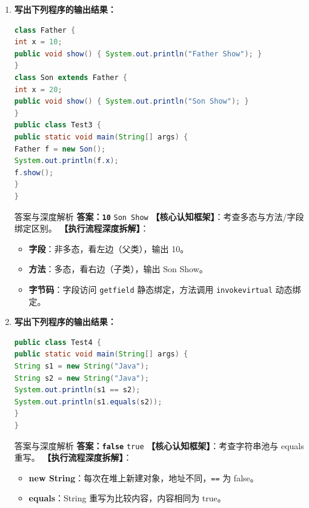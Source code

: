 ﻿\documentclass[12pt, a4paper]{ctexart}
\newcommand{\code}[1]{\texttt{#1}}
\begin{document}
\begin{enumerate}[label=\textbf{\arabic*.}, leftmargin=*, itemsep=1.5em]
	\item \textbf{写出下列程序的输出结果：}
	      \begin{lstlisting}[language=Java]
class Father {
int x = 10;
public void show() { System.out.println("Father Show"); }
}
class Son extends Father {
int x = 20;
public void show() { System.out.println("Son Show"); }
}
public class Test3 {
public static void main(String[] args) {
Father f = new Son();
System.out.println(f.x);
f.show();
}
}
\end{lstlisting}
	      \begin{bluebox}{答案与深度解析}
		      \textbf{答案：\code{10}} \newline \code{Son Show}
		      \textbf{【核心认知框架】}：考查多态与方法/字段绑定区别。
		      \textbf{【执行流程深度拆解】}：
		      \begin{itemize}[leftmargin=*, nosep]
			      \item \textbf{字段}：非多态，看左边（父类），输出 10。
			      \item \textbf{方法}：多态，看右边（子类），输出 Son Show。
			      \item \textbf{字节码}：字段访问 \code{getfield} 静态绑定，方法调用 \code{invokevirtual} 动态绑定。
		      \end{itemize}
	      \end{bluebox}

	\item \textbf{写出下列程序的输出结果：}
	      \begin{lstlisting}[language=Java]
public class Test4 {
public static void main(String[] args) {
String s1 = new String("Java");
String s2 = new String("Java");
System.out.println(s1 == s2);
System.out.println(s1.equals(s2));
}
}
\end{lstlisting}
	      \begin{bluebox}{答案与深度解析}
		      \textbf{答案：\code{false}} \newline \code{true}
		      \textbf{【核心认知框架】}：考查字符串池与 equals 重写。
		      \textbf{【执行流程深度拆解】}：
		      \begin{itemize}[leftmargin=*, nosep]
			      \item \textbf{new String}：每次在堆上新建对象，地址不同，\code{==} 为 false。
			      \item \textbf{equals}：String 重写为比较内容，内容相同为 true。
		      \end{itemize}
	      \end{bluebox}


\end{enumerate}
\end{document}
